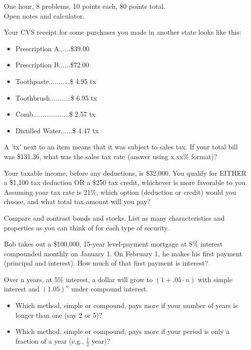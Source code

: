 \documentclass[12pt]{exam}
\begin{document}
\begin{flushleft}
    One hour, 8 problems, 10 points each, 80 points total. \\
    Open notes and calculator.
\end{flushleft}

\begin{questions}
    \question Your CVS receipt for some purchases you made in another state looks like this:
    \begin{itemize}
        \item Prescription A......\$39.00
        \item Prescription B......\$72.00
        \item Toothpaste...........\$ 4.95    tx
        \item Toothbrush...........\$ 6.95    tx
        \item Comb...................\$ 2.57    tx
        \item Distilled Water......\$ 4.47    tx
    \end{itemize}

    A 'tx' next to an item means that it was subject to sales tax.
    If your total bill was \$131.36, what was the sales tax rate (answer using x.xx\% format)?
    \vspace{1in}

    \question Your taxable income, before any deductions, is \$32,000.  You qualify for EITHER a
    \$1,100 tax deduction OR a \$250 tax credit, whichever is more favorable to you.  Assuming your
    tax rate is 21\%, which option (deduction or credit) would  you choose, and what total tax
    amount will you pay?
    \vspace{1in}

    \question Compare and contrast bonds and stocks.  List as many characteristics and properties
    as you can think of for each type of security.
    \vspace{1.25in}

    \question Bob takes out a \$100,000, 15-year level-payment mortgage at 8\% interest compounded monthly on January 1.
    On February 1, he makes his first payment (principal and interest).  How much of that first payment
    is interest?
    \vspace{1in}

    \question Over n years, at 5\% interest, a dollar will grow to $ (1+.05 \cdot n) $ with simple interest
    and $ (1.05)^n $ under compound interest.
    \begin{itemize}
        \item Which method, simple or compound, pays more if your number of
            years is longer than one (say 2 or 5)?
        \item Which method, simple or compound, pays more if your period is only
            a fraction of a year (e.g., $ \frac{1}{2} $ year)?
    \end{itemize}
    \vspace{1.5in}


\end{questions}
\end{document}

